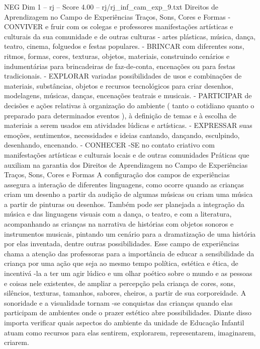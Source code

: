 \begin{textsample}{NEG Dim 1 – rj – Score 4.00 – rj/rj\_inf\_cam\_exp\_9.txt}  \label{ex:f1_neg_007}
Direitos de Aprendizagem no Campo de Experiências Traços, Sons, Cores e Formas - CONVIVER e fruir com os colegas e professores manifestações artísticas e culturais da sua comunidade e de outras culturas - artes plásticas, música, dança, teatro, cinema, folguedos e festas populares. - BRINCAR com diferentes sons, ritmos, formas, cores, texturas, objetos, materiais, construindo cenários e indumentárias para brincadeiras de faz-de-conta, encenações ou para festas tradicionais. - EXPLORAR variadas possibilidades de usos e combinações de materiais, substâncias, objetos e recursos tecnológicos para criar desenhos, modelagens, músicas, danças, encenações teatrais e musicais. - PARTICIPAR de decisões e ações relativas à organização do ambiente ( tanto o cotidiano quanto o preparado para determinados eventos ), à definição de temas e à escolha de materiais a serem usados em atividades lúdicas e artísticas. - EXPRESSAR suas emoções, sentimentos, necessidades e ideias cantando, dançando, esculpindo, desenhando, encenando. - CONHECER -SE no contato criativo com manifestações artísticas e culturais locais e de outras comunidades Práticas que auxiliam na garantia dos Direitos de Aprendizagem no Campo de Experiências Traços, Sons, Cores e Formas A configuração dos campos de experiências assegura a interação de diferentes linguagens, como ocorre quando as crianças criam um desenho a partir da audição de algumas músicas ou criam uma música a partir de pinturas ou desenhos.
Também pode ser planejada a integração da música e das linguagens visuais com a dança, o teatro, e com a literatura, acompanhando as crianças na narrativa de histórias com objetos sonoros e instrumentos musicais, pintando um cenário para a dramatização de uma história por elas inventada, dentre outras possibilidades.
Esse campo de experiências chama a atenção das professoras para a importância de educar a sensibilidade da criança por uma ação que seja ao mesmo tempo política, estética e ética, de incentivá -la a ter um agir lúdico e um olhar poético sobre o mundo e as pessoas e coisas nele existentes, de ampliar a percepção pela criança de cores, sons, silêncios, texturas, tamanhos, sabores, cheiros, a partir de sua corporeidade.
A sonoridade e a visualidade tornam -se conquistas das crianças quando elas participam de ambientes onde o prazer estético abre possibilidades.
Diante disso importa verificar quais aspectos do ambiente da unidade de Educação Infantil atuam como recursos para elas sentirem, explorarem, representarem, imaginarem, criarem.

\end{textsample}
